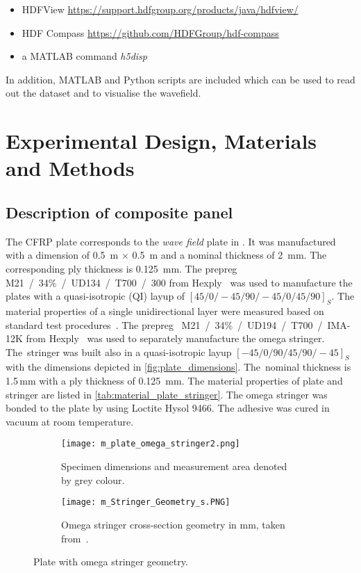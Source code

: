 \documentclass[times,final]{elsarticle}
\begin{document}
\begin{itemize} 
\item HDFView \url{https://support.hdfgroup.org/products/java/hdfview/}
\item HDF Compass \url{https://github.com/HDFGroup/hdf-compass} 
\item a MATLAB command \textit{h5disp}
\end{itemize}

In addition, MATLAB and Python scripts are included which can be used to read out the dataset and to visualise the wavefield. 

\section{Experimental Design, Materials and Methods}

\subsection{Description of composite panel}

The CFRP plate corresponds to the \textit{wave field} plate in \cite{Moll2020}. It was manufactured  with a  dimension of \SI{0.5}{\meter} $\times$ \SI{0.5}{\meter} and a nominal thickness of \SI{2}{\milli\meter}. The
corresponding ply thickness is \SI{0.125}{\milli\meter}. The prepreg  \mbox{M21~/~34\%~/~UD134~/~T700~/~300} from Hexply~\textsuperscript{\textregistered} was used to manufacture the plates with a quasi-isotropic (QI) layup of \mbox{$[45/0/-45/90/-45/0/45/90]_S$}. 
The material properties of a single unidirectional layer were measured based on  standard test procedures~\cite{moll_open_2018}. 
The prepreg \mbox{~M21~/~34\%~/~UD194~/~T700~/~IMA-12K} from Hexply~\textsuperscript{\textregistered} was used to separately manufacture the omega stringer. 
The~stringer was  built also in a quasi-isotropic layup \mbox{$[-45/0/90/45/90/-45]_S$} with the dimensions depicted in \autoref{fig:plate_dimensions}. The~nominal thickness is 1.5\,mm with a ply thickness of \SI{0.125}{\milli\meter}. The material properties of plate and stringer are listed in \autoref{tab:material_plate_stringer}. 
The omega stringer was bonded to the plate by using Loctite Hysol 9466. The adhesive was cured in vacuum at room temperature.

\begin{figure} [h!]
	\centering
	\begin{subfigure}[b]{\textwidth}
	\centering
		\texttt{[image: m\_plate\_omega\_stringer2.png]}
		\caption{Specimen dimensions and measurement area denoted by grey colour.}
		\label{fig:sldv_area}
	\end{subfigure}
	\begin{subfigure}[b]{\textwidth}
	\centering
	\texttt{[image: m\_Stringer\_Geometry\_s.PNG]}
	\caption{Omega stringer cross-section geometry in \si{\milli\meter}, taken from~\cite{Moll2020}.}
	\label{fig:stringer_crosssection}
	\end{subfigure}
	\caption{Plate with omega stringer geometry.}
	\label{fig:plate_dimensions}
\end{figure}
\end{document}
